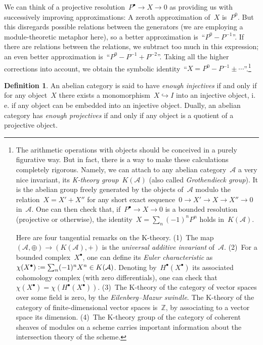 \documentclass{amsart}
\makeatletter
\theoremstyle{definition}
\newtheorem{defn}{Definition}[section]
\theoremstyle{plain}
\theoremstyle{remark}
\newcommand{\ZZ}{\mathbb{Z}}
\newcommand{\A}{\mathcal{A}}
\newcommand{\?}{\,{:}\,}
\renewcommand{\_}{\mathpunct{.}\,}
\newcommand{\ie}{i.\,e.\@\xspace}
\newcommand{\defeq}{\vcentcolon=}
\makeatother
\begin{document}
We can think of a projective resolution~$P^\bullet \to X \to 0$ as providing us
with successively improving approximations: A zeroth approximation of~$X$
is~$P^0$. But this disregards possible relations between the generators (we are
employing a module-theoretic metaphor here), so a better approximation
is~``$P^0 - P^{-1}$''. If there are relations between the relations, we subtract
too much in this expression; an even better approximation is~``$P^0 - P^{-1} +
P^{-2}$''. Taking all the higher corrections into account, we obtain the
symbolic identity~``$X = P^0 - P^{-1} \pm \cdots$''.\footnote{The arithmetic
operations with objects should be conceived in a purely figurative
way. But in fact, there is a way to make these calculations completely
rigorous. Namely, we can attach to any abelian category~$\A$ a very nice
invariant, its \emph{K-theory group}~$K(\A)$ (also called \emph{Grothendieck
group}). It is the abelian group freely generated by the objects of~$\A$ modulo
the relation~$X = X' + X''$ for any short exact sequence~$0 \to X' \to X \to
X'' \to 0$ in~$\A$. One can then check that, if~$P^\bullet \to X \to 0$ is a
bounded resolution (projective or otherwise), the identity~$X = \sum_n (-1)^n
P^n$ holds in~$K(\A)$.

Here are four tangential remarks on the K-theory. (1)~The
map~$(\A,{\oplus})\to(K(\A),{+})$ is the \emph{universal additive invariant}
of~$\A$. (2)~For a bounded complex~$X^\bullet$, one can define its \emph{Euler
characteristic} as~$\chi(X^\bullet) \defeq \sum_n (-1)^n X^n \in K(\A)$.
Denoting by~$H^\bullet(X^\bullet)$ its associated cohomology complex (with zero
differentials), one can check that~$\chi(X^\bullet) =
\chi(H^\bullet(X^\bullet))$. (3)~The K-theory of the category of vector spaces
over some field is zero, by the \emph{Eilenberg--Mazur swindle}. The K-theory
of the category of finite-dimensional vector spaces is~$\ZZ$, by associating to
a vector space its dimension. (4)~The K-theory group of the category of
coherent sheaves of modules on a scheme carries important information about the
intersection theory of the scheme.}

\begin{defn}An abelian category is said to have \emph{enough injectives} if and
only if for any object~$X$ there exists a monomorphism~$X \hookrightarrow I$
into an injective object, \ie if any object can be embedded into an injective
object. Dually, an abelian category has \emph{enough
projectives} if and only if any object is a quotient of a projective
object.\end{defn}
\end{document}
